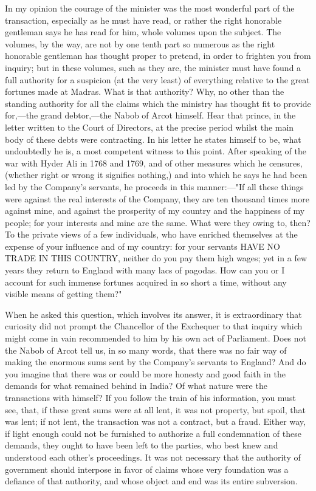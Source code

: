 In my opinion the courage of the minister was the most wonderful part of the transaction, especially as he must have read, or rather the right honorable gentleman says he has read for him, whole volumes upon the subject. The volumes, by the way, are not by one tenth part so numerous as the right honorable gentleman has thought proper to pretend, in order to frighten you from inquiry; but in these volumes, such as they are, the minister must have found a full authority for a suspicion (at the very least) of everything relative to the great fortunes made at Madras. What is that authority? Why, no other than the standing authority for all the claims which the ministry has thought fit to provide for,—the grand debtor,—the Nabob of Arcot himself. Hear that prince, in the letter written to the Court of Directors, at the precise period whilst the main body of these debts were contracting. In his letter he states himself to be, what undoubtedly he is, a most competent witness to this point. After speaking of the war with Hyder Ali in 1768 and 1769, and of other measures which he censures, (whether right or wrong it signifies nothing,) and into which he says he had been led by the Company's servants, he proceeds in this manner:—"If all these things were against the real interests of the Company, they are ten thousand times more against mine, and against the prosperity of my country and the happiness of my people; for your interests and mine are the same. What were they owing to, then? To the private views of a few individuals, who have enriched themselves at the expense of your influence and of my country: for your servants HAVE NO TRADE IN THIS COUNTRY, neither do you pay them high wages; yet in a few years they return to England with many lacs of pagodas. How can you or I account for such immense fortunes acquired in so short a time, without any visible means of getting them?"

When he asked this question, which involves its answer, it is extraordinary that curiosity did not prompt the Chancellor of the Exchequer to that inquiry which might come in vain recommended to him by his own act of Parliament. Does not the Nabob of Arcot tell us, in so many words, that there was no fair way of making the enormous sums sent by the Company's servants to England? And do you imagine that there was or could be more honesty and good faith in the demands for what remained behind in India? Of what nature were the transactions with himself? If you follow the train of his information, you must see, that, if these great sums were at all lent, it was not property, but spoil, that was lent; if not lent, the transaction was not a contract, but a fraud. Either way, if light enough could not be furnished to authorize a full condemnation of these demands, they ought to have been left to the parties, who best knew and understood each other's proceedings. It was not necessary that the authority of government should interpose in favor of claims whose very foundation was a defiance of that authority, and whose object and end was its entire subversion.

